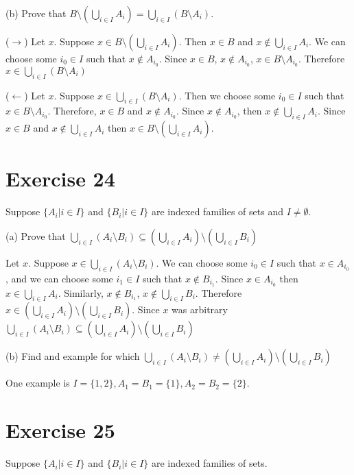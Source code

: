 \documentclass[11pt]{article}
\begin{document}
\noindent (b) Prove that 
$B \setminus (\bigcup_{i \in I} A_i) = \bigcup_{i \in I} (B \setminus A_i)$.

($\rightarrow$) Let $x$. Suppose $x \in B \setminus (\bigcup_{i \in I} A_i)$. 
Then $x \in B$ and $x \notin \bigcup_{i \in I} A_i$. We can choose some $i_0 \in I$
such that $x \notin A_{i_0}$. Since $x \in B$, $x \notin A_{i_0}$, 
$x \in B \setminus A_{i_0}$. Therefore $x \in \bigcup_{i \in I} (B \setminus A_i)$

($\leftarrow$) Let $x$. Suppose $x \in \bigcup_{i \in I} (B \setminus A_i)$.
Then we choose some $i_0 \in I$ such that $x \in B \setminus A_{i_0}$. 
Therefore, $x \in B$ and $x \notin A_{i_0}$. Since $x \notin A_{i_0}$,
then $x \notin \bigcup_{i \in I} A_i$. Since $x \in B$ and 
$x \notin \bigcup_{i \in I} A_i$ then $x \in B \setminus (\bigcup_{i \in I} A_i)$.

\section*{Exercise 24}

Suppose $\{ A_i | i \in I \}$ and $\{ B_i | i \in I \}$ are indexed families of 
sets and $I \neq \emptyset$.

\noindent (a) Prove that 
$\bigcup_{i \in I} (A_i \setminus B_i) \subseteq (\bigcup_{i \in I} A_i) \setminus (\bigcup_{i \in I} B_i)$

Let $x$. Suppose $x \in \bigcup_{i \in I} (A_i \setminus B_i)$. We can choose 
some $i_0 \in I$ such that $x \in A_{i_0}$, and we can choose some $i_1 \in I$ 
such that $x \notin B_{i_1}$. Since $x \in A_{i_0}$ then 
$x \in \bigcup_{i \in I} A_i$. Similarly, $x \notin B_{i_1}$, 
$x \notin \bigcup_{i \in I} B_i$. Therefore 
$x \in (\bigcup_{i \in I} A_i) \setminus (\bigcup_{i \in I} B_i)$.
Since $x$ was arbitrary 
$\bigcup_{i \in I} (A_i \setminus B_i) \subseteq (\bigcup_{i \in I} A_i) \setminus (\bigcup_{i \in I} B_i)$

\noindent (b) Find and example for which 
$\bigcup_{i \in I} (A_i \setminus B_i) \neq (\bigcup_{i \in I} A_i) \setminus (\bigcup_{i \in I} B_i)$

One example is $I = \{1, 2\}, A_1 = B_1 = \{1\}, A_2 = B_2 = \{2\}$.

\section*{Exercise 25}

Suppose $\{ A_i | i \in I \}$ and $\{ B_i | i \in I \}$ are indexed families of 
sets.
\end{document}
